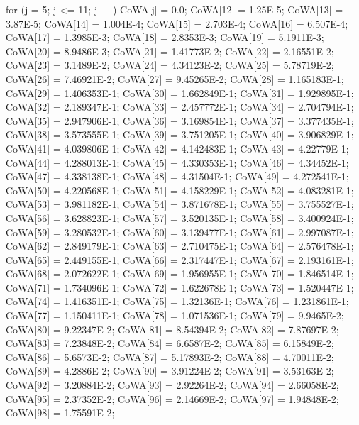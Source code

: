 \begin{code}
\begin{hide}
{      for (j = 5; j <= 11; j++) {
         CoWA[j] = 0.0;
      }
      CoWA[12] = 1.25E-5;
      CoWA[13] = 3.87E-5;
      CoWA[14] = 1.004E-4;
      CoWA[15] = 2.703E-4;
      CoWA[16] = 6.507E-4;
      CoWA[17] = 1.3985E-3;
      CoWA[18] = 2.8353E-3;
      CoWA[19] = 5.1911E-3;
      CoWA[20] = 8.9486E-3;
      CoWA[21] = 1.41773E-2;
      CoWA[22] = 2.16551E-2;
      CoWA[23] = 3.1489E-2;
      CoWA[24] = 4.34123E-2;
      CoWA[25] = 5.78719E-2;
      CoWA[26] = 7.46921E-2;
      CoWA[27] = 9.45265E-2;
      CoWA[28] = 1.165183E-1;
      CoWA[29] = 1.406353E-1;
      CoWA[30] = 1.662849E-1;
      CoWA[31] = 1.929895E-1;
      CoWA[32] = 2.189347E-1;
      CoWA[33] = 2.457772E-1;
      CoWA[34] = 2.704794E-1;
      CoWA[35] = 2.947906E-1;
      CoWA[36] = 3.169854E-1;
      CoWA[37] = 3.377435E-1;
      CoWA[38] = 3.573555E-1;
      CoWA[39] = 3.751205E-1;
      CoWA[40] = 3.906829E-1;
      CoWA[41] = 4.039806E-1;
      CoWA[42] = 4.142483E-1;
      CoWA[43] = 4.22779E-1;
      CoWA[44] = 4.288013E-1;
      CoWA[45] = 4.330353E-1;
      CoWA[46] = 4.34452E-1;
      CoWA[47] = 4.338138E-1;
      CoWA[48] = 4.31504E-1;
      CoWA[49] = 4.272541E-1;
      CoWA[50] = 4.220568E-1;
      CoWA[51] = 4.158229E-1;
      CoWA[52] = 4.083281E-1;
      CoWA[53] = 3.981182E-1;
      CoWA[54] = 3.871678E-1;
      CoWA[55] = 3.755527E-1;
      CoWA[56] = 3.628823E-1;
      CoWA[57] = 3.520135E-1;
      CoWA[58] = 3.400924E-1;
      CoWA[59] = 3.280532E-1;
      CoWA[60] = 3.139477E-1;
      CoWA[61] = 2.997087E-1;
      CoWA[62] = 2.849179E-1;
      CoWA[63] = 2.710475E-1;
      CoWA[64] = 2.576478E-1;
      CoWA[65] = 2.449155E-1;
      CoWA[66] = 2.317447E-1;
      CoWA[67] = 2.193161E-1;
      CoWA[68] = 2.072622E-1;
      CoWA[69] = 1.956955E-1;
      CoWA[70] = 1.846514E-1;
      CoWA[71] = 1.734096E-1;
      CoWA[72] = 1.622678E-1;
      CoWA[73] = 1.520447E-1;
      CoWA[74] = 1.416351E-1;
      CoWA[75] = 1.32136E-1;
      CoWA[76] = 1.231861E-1;
      CoWA[77] = 1.150411E-1;
      CoWA[78] = 1.071536E-1;
      CoWA[79] = 9.9465E-2;
      CoWA[80] = 9.22347E-2;
      CoWA[81] = 8.54394E-2;
      CoWA[82] = 7.87697E-2;
      CoWA[83] = 7.23848E-2;
      CoWA[84] = 6.6587E-2;
      CoWA[85] = 6.15849E-2;
      CoWA[86] = 5.6573E-2;
      CoWA[87] = 5.17893E-2;
      CoWA[88] = 4.70011E-2;
      CoWA[89] = 4.2886E-2;
      CoWA[90] = 3.91224E-2;
      CoWA[91] = 3.53163E-2;
      CoWA[92] = 3.20884E-2;
      CoWA[93] = 2.92264E-2;
      CoWA[94] = 2.66058E-2;
      CoWA[95] = 2.37352E-2;
      CoWA[96] = 2.14669E-2;
      CoWA[97] = 1.94848E-2;
      CoWA[98] = 1.75591E-2;
}
\end{hide}
\end{code}
